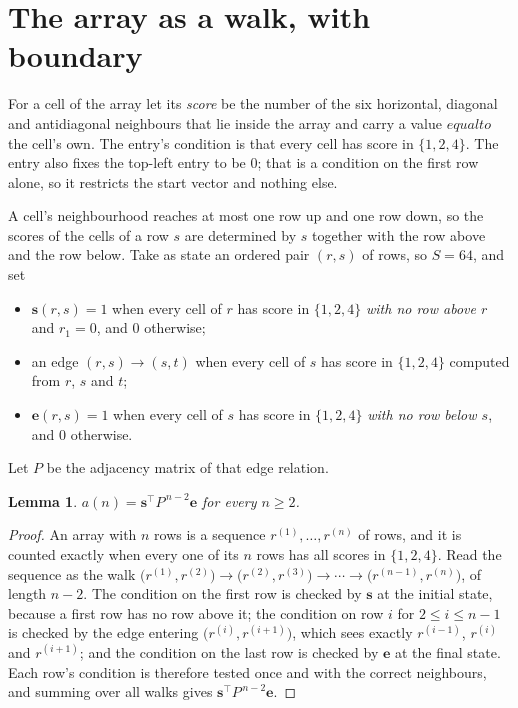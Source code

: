 \documentclass[11pt,a4paper]{article}
\theoremstyle{plain}
\newtheorem{lemma}[theorem]{Lemma}
\theoremstyle{definition}
\begin{document}
\section{The array as a walk, with boundary}

For a cell of the array let its \emph{score} be the number of the six horizontal, diagonal and antidiagonal neighbours that lie inside
the array and carry a value $equal to$ the cell's own. The entry's condition is that every cell
has score in $\{1,2,4\}$. The entry also fixes the top-left entry to be $0$; that is a condition on the first row alone, so it restricts the start vector and nothing else.

A cell's neighbourhood reaches at most one row up and one row down, so the scores of the
cells of a row $s$ are determined by $s$ together with the row above and the row below.
Take as state an ordered pair $(r,s)$ of rows, so $S=64$, and set
\begin{itemize}
\item $\mathbf{s}(r,s)=1$ when every cell of $r$ has score in $\{1,2,4\}$ \emph{with no row
above $r$} and $r_1=0$, and $0$ otherwise;
\item an edge $(r,s)\to(s,t)$ when every cell of $s$ has score in $\{1,2,4\}$ computed from
$r$, $s$ and $t$;
\item $\mathbf{e}(r,s)=1$ when every cell of $s$ has score in $\{1,2,4\}$ \emph{with no row
below $s$}, and $0$ otherwise.
\end{itemize}
Let $P$ be the adjacency matrix of that edge relation.

\begin{lemma}\label{lem:walk}
$a(n)=\mathbf{s}^{\!\top}P^{\,n-2}\mathbf{e}$ for every $n\ge2$.
\end{lemma}

\begin{proof}
An array with $n$ rows is a sequence $r^{(1)},\dots,r^{(n)}$ of rows, and it is counted
exactly when every one of its $n$ rows has all scores in $\{1,2,4\}$. Read the sequence as the
walk $\bigl(r^{(1)},r^{(2)}\bigr)\to\bigl(r^{(2)},r^{(3)}\bigr)\to\cdots\to
\bigl(r^{(n-1)},r^{(n)}\bigr)$, of length $n-2$. The condition on the first row is
checked by $\mathbf{s}$ at the initial state, because a first row has no row above it; the
condition on row $i$ for $2\le i\le n-1$ is checked by the edge entering
$\bigl(r^{(i)},r^{(i+1)}\bigr)$, which sees exactly $r^{(i-1)}$, $r^{(i)}$ and
$r^{(i+1)}$; and the condition on the last row is checked by $\mathbf{e}$ at the final
state. Each row's condition is therefore tested once and with the correct neighbours, and
summing over all walks gives $\mathbf{s}^{\!\top}P^{\,n-2}\mathbf{e}$.
\end{proof}
\end{document}
